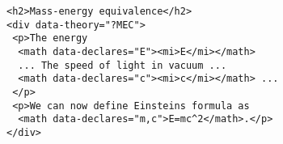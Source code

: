 \begin{lstlisting}
<h2>Mass-energy equivalence</h2>
<div data-theory="?MEC">
 <p>The energy
  <math data-declares="E"><mi>E</mi></math>
  ... The speed of light in vacuum ... 
  <math data-declares="c"><mi>c</mi></math> ...
 </p>
 <p>We can now define Einsteins formula as 
  <math data-declares="m,c">E=mc^2</math>.</p>
</div>
\end{lstlisting}

